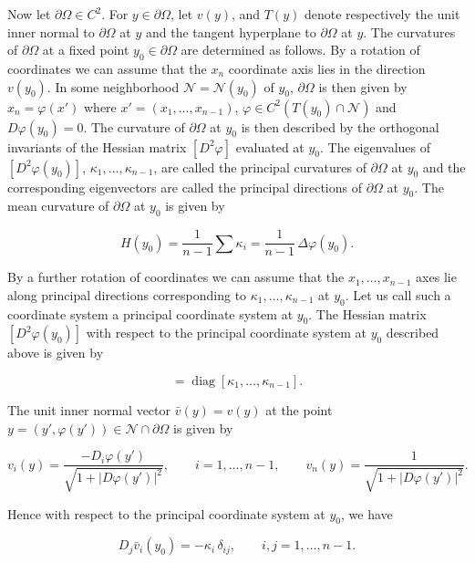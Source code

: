 Now let $\partial\Omega \in C^2$. For $y \in \partial\Omega$, let $v(y)$, and $T(y)$ denote respectively the unit
inner normal to $\partial\Omega$ at $y$ and the tangent hyperplane to $\partial\Omega$ at $y$. The curvatures of
$\partial\Omega$ at a fixed point $y_0\in\partial\Omega$ are determined as follows. By a rotation of coordinates
we can assume that the $x_n$ coordinate axis lies in the direction $v(y_0)$. In some
neighborhood $\mathcal{N}=\mathcal{N}(y_0)$ of $y_0$, $\partial\Omega$ is then given by $x_n=\varphi(x')$ where $x'=
(x_1,\ldots,x_{n-1})$, $\varphi\in C^2(T(y_0)\cap\mathcal{N})$ and $D\varphi(y_0)=0$. The curvature of $\partial\Omega$ at $y_0$ is
then described by the orthogonal invariants of the Hessian matrix $[D^2\varphi]$ evaluated
at $y_0$. The eigenvalues of $[D^2\varphi(y_0)]$, $\kappa_1,\ldots,\kappa_{n-1}$, are called the principal curvatures
of $\partial\Omega$ at $y_0$ and the corresponding eigenvectors are called the principal directions
of $\partial\Omega$ at $y_0$. The mean curvature of $\partial\Omega$ at $y_0$ is given by

\begin{equation}
H(y_0)=\frac{1}{n-1}\sum \kappa_i=\frac{1}{n-1}\,\Delta\varphi(y_0).
\tag{14.92}
\end{equation}

By a further rotation of coordinates we can assume that the $x_1,\ldots,x_{n-1}$ axes lie
along principal directions corresponding to $\kappa_1,\ldots,\kappa_{n-1}$ at $y_0$. Let us call such a
coordinate system a principal coordinate system at $y_0$. The Hessian matrix
$[D^2\varphi(y_0)]$ with respect to the principal coordinate system at $y_0$ described above
is given by

\begin{equation}
[D^2\varphi(y_0)]=\operatorname{diag}[\kappa_1,\ldots,\kappa_{n-1}].
\tag{14.93}
\end{equation}

The unit inner normal vector $\bar v(y)=v(y)$ at the point $y=(y',\varphi(y'))\in\mathcal{N}\cap\partial\Omega$
is given by

\begin{equation}
v_i(y)=\frac{-D_i\varphi(y')}{\sqrt{1+|D\varphi(y')|^2}},\qquad i=1,\ldots,n-1,\qquad
v_n(y)=\frac{1}{\sqrt{1+|D\varphi(y')|^2}}.
\tag{14.94}
\end{equation}

Hence with respect to the principal coordinate system at $y_0$, we have

\begin{equation}
D_j\bar v_i(y_0)=-\kappa_i\,\delta_{ij},\qquad i,j=1,\ldots,n-1.
\tag{14.95}
\end{equation}


